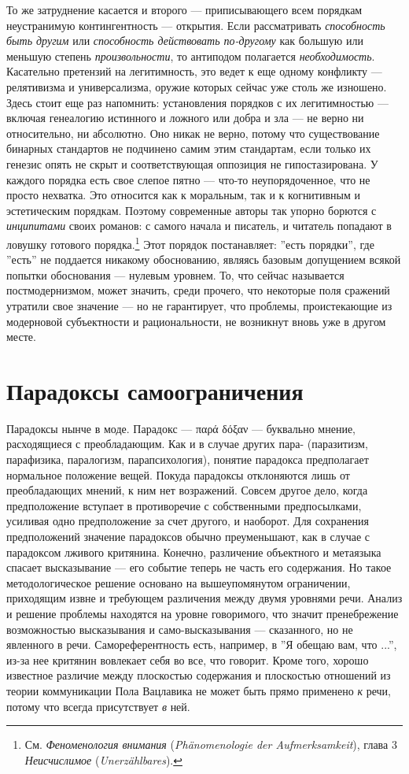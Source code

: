 \documentclass[12pt]{book}
\begin{document}
То же затруднение касается и второго --- приписывающего всем порядкам неустранимую контингентность --- открытия. Если рассматривать \textit{способность быть другим} или \textit{способность действовать по-другому} как большую или меньшую степень \textit{произвольности}, то антиподом полагается \textit{необходимость}. Касательно претензий на легитимность, это ведет к еще одному конфликту --- релятивизма и универсализма, оружие которых сейчас уже столь же изношено. Здесь стоит еще раз напомнить: установления порядков с их легитимностью --- включая генеалогию истинного и ложного или добра и зла --- не верно ни относительно, ни абсолютно. Оно никак не верно, потому что существование бинарных стандартов не подчинено самим этим стандартам, если только их генезис опять не скрыт и соответствующая оппозиция не гипостазирована. У каждого порядка есть свое слепое пятно --- что-то неупорядоченное, что не просто нехватка. Это относится как к моральным, так и к когнитивным и эстетическим порядкам. Поэтому современные авторы так упорно борются с \textit{инципитами} своих романов: с самого начала и писатель, и читатель попадают в ловушку готового порядка.\footnote{См. \textit{Феноменология внимания} (\textit{Phänomenologie der Aufmerksamkeit}), глава 3 \textit{Неисчислимое} (\textit{Unerzählbares}).} Этот порядок постанавляет: ''есть порядки'', где ''есть'' не поддается никакому обоснованию, являясь базовым допущением всякой попытки обоснования --- нулевым уровнем. То, что сейчас называется постмодернизмом, может значить, среди прочего, что некоторые поля сражений утратили свое значение --- но не гарантирует, что проблемы, проистекающие из модерновой субъектности и рациональности, не возникнут вновь уже в другом месте.

\section{Парадоксы самоограничения}

Парадоксы нынче в моде. Парадокс --- παρά δόξαν --- буквально мнение, расходящиеся с преобладающим. Как и в случае других пара- (паразитизм, парафизика, паралогизм, парапсихология), понятие парадокса предполагает нормальное положение вещей. Покуда парадоксы отклоняются лишь от преобладающих мнений, к ним нет возражений. Совсем другое дело, когда предположение вступает в противоречие с собственными предпосылками, усиливая одно предположение за счет другого, и наоборот. Для сохранения предположений значение парадоксов обычно преуменьшают, как в случае с парадоксом лживого критянина. Конечно, различение объектного и метаязыка спасает высказывание --- его событие теперь не часть его содержания. Но такое методологическое решение основано на вышеупомянутом ограничении, приходящим извне и требующем различения между двумя уровнями речи. Анализ и решение проблемы находятся на уровне говоримого, что значит пренебрежение возможностью высказывания и само-высказывания --- сказанного, но не явленного в речи. Самореферентность есть, например, в ''Я обещаю вам, что ...'', из-за нее критянин вовлекает себя во все, что говорит. Кроме того, хорошо известное различие между плоскостью содержания и плоскостью отношений из теории коммуникации Пола Вацлавика не может быть прямо применено \textit{к} речи, потому что всегда присутствует \textit{в} ней.
\end{document}
